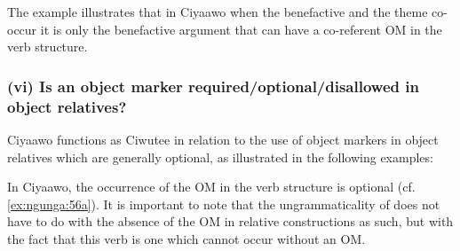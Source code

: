 \documentclass[output=paper]{langscibook}
\begin{document}
\z
\z

The example  illustrates that in Ciyaawo when the benefactive and the theme co-occur it is only the benefactive argument that can have a co-referent OM in the verb structure.  

\subsubsection{(vi) Is an object marker required/optional/disallowed in object relatives?}

Ciyaawo functions as Ciwutee in relation to the use of object markers in object relatives which are generally optional, as illustrated in the following examples: 

\ea\label{ex:ngunga:56}


    \z
\z

In Ciyaawo, the occurrence of the OM in the verb structure is optional (cf. \ref{ex:ngunga:56a}). It is important to note that the ungrammaticality of  does not have to do with the absence of the OM in relative constructions as such, but with the fact that this verb is one which cannot occur without an OM. 
\end{document}
